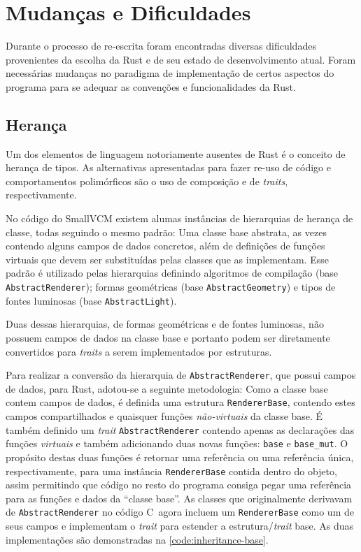 \documentclass[tg]{mdtufsm}
\def\Cpp{{C\nolinebreak[4]\raisebox{.20ex}{\small\bf++}}}
\newcommand{\todo}[1]{}
\begin{document}
\todo{Overview do código necessário para o objetivo.}

\section{Mudanças e Dificuldades}

Durante o processo de re-escrita foram encontradas diversas dificuldades provenientes da escolha da Rust e de seu estado de desenvolvimento atual. Foram necessárias mudanças no paradigma de implementação de certos aspectos do programa para se adequar as convenções e funcionalidades da Rust.

\subsection{Herança}

Um dos elementos de linguagem notoriamente ausentes de Rust é o conceito de herança de tipos. As alternativas apresentadas para fazer re-uso de código e comportamentos polimórficos são o uso de composição e de \emph{traits}, respectivamente.

No código do SmallVCM existem alumas instâncias de hierarquias de herança de classe, todas seguindo o mesmo padrão: Uma classe base abstrata, as vezes contendo alguns campos de dados concretos, além de definições de funções virtuais que devem ser substituídas pelas classes que as implementam. Esse padrão é utilizado pelas hierarquias definindo algoritmos de compilação (base \texttt{AbstractRenderer}); formas geométricas (base \texttt{AbstractGeometry}) e tipos de fontes luminosas (base \texttt{AbstractLight}).

Duas dessas hierarquias, de formas geométricas e de fontes luminosas, não possuem campos de dados na classe base e portanto podem ser diretamente convertidos para \emph{traits} a serem implementados por estruturas.

Para realizar a conversão da hierarquia de \texttt{AbstractRenderer}, que possui campos de dados, para Rust, adotou-se a seguinte metodologia: Como a classe base contem campos de dados, é definida uma estrutura \texttt{RendererBase}, contendo estes campos compartilhados e quaisquer funções \emph{não-virtuais} da classe base. É também definido um \emph{trait} \texttt{AbstractRenderer} contendo apenas as declarações das funções \emph{virtuais} e também adicionando duas novas funções: \texttt{base} e \texttt{base\_mut}. O propósito destas duas funções é retornar uma referência ou uma referência única, respectivamente, para uma instância \texttt{RendererBase} contida dentro do objeto, assim permitindo que código no resto do programa consiga pegar uma referência para as funções e dados da ``classe base''. As classes que originalmente derivavam de \texttt{AbstractRenderer} no código \Cpp\ agora incluem um \texttt{RendererBase} como um de seus campos e implementam o \emph{trait} para estender a estrutura/\emph{trait} base. As duas implementações são demonstradas na \autoref{code:inheritance-base}.
\end{document}
